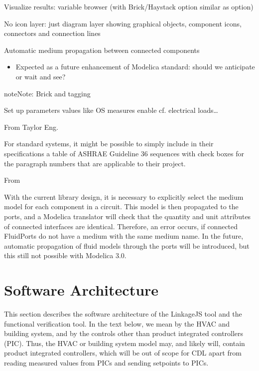 \documentclass[letterpaper,10pt, openany,english]{sphinxmanual}
\begin{document}
Visualize results: variable browser (with Brick/Haystack option similar as  option)

No icon layer: just diagram layer showing graphical objects, component icons, connectors and connection lines

Automatic medium propagation between connected components
\begin{itemize}
\item {} 
Expected as a future enhancement of Modelica standard: should we anticipate or wait and see?

\end{itemize}

\begin{sphinxadmonition}{note}{Note:}
Brick and tagging

Set up parameters values like OS measures enable cf. electrical loads…

From Taylor Eng.

For standard systems, it might be possible to simply include in their specifications a table of ASHRAE Guideline 36 sequences with check boxes for the paragraph numbers that are applicable to their project.

From 

With the current library design, it is necessary to explicitly select the medium model for each component in a circuit. This model is then propagated to the ports, and a Modelica translator will check that the quantity and unit attributes of connected interfaces are identical. Therefore, an error occurs, if connected FluidPorts do not have a medium with the same medium name. In the future, automatic propagation of fluid models through the ports will be introduced, but this still not possible with Modelica 3.0.
\end{sphinxadmonition}


\chapter{Software Architecture}
\label{\detokenize{softwareArchitecture:software-architecture}}\label{\detokenize{softwareArchitecture:sec-soft-arch}}\label{\detokenize{softwareArchitecture::doc}}
This section describes the software architecture
of the LinkageJS tool and the functional verification tool.
In the text below, we mean by  the HVAC and building system,
and by  the controls other than product integrated controllers
(PIC).
Thus, the HVAC or building system model may, and likely will,
contain product integrated controllers, which will be out
of scope for CDL apart from reading measured values from PICs and
sending setpoints to PICs.
\end{document}

